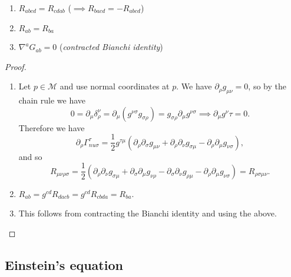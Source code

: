 \documentclass{jknotes}
\begin{document}
\begin{lemma}
    \begin{enumerate}
        \item \(R_{abcd} = R_{cdab}\) (\(\implies R_{bacd} = -R_{abcd}\))
        \item \(R_{ab} = R_{ba}\)
        \item \(\nabla^aG_{ab}=0\) (\emph{contracted Bianchi identity})
    \end{enumerate}
\end{lemma}
\begin{proof}
    \begin{enumerate}
        \item Let \(p\in\mathcal{M}\) and use normal coordinates at \(p\). We have \(\partial_\rho g_{\mu\nu}=0\), so by the chain rule we have
            \begin{equation}
                0 = \partial_\mu\delta_\rho^\nu = \partial_\mu(g^{\nu\sigma}g_{\sigma\rho}) = g_{\sigma\rho}\partial_\mu g^{\nu\sigma} \implies \partial_\mu g^\nu\tau = 0.
            \end{equation}
            Therefore we have
            \begin{equation}
                \partial_\rho \Gamma^\tau_{nu\sigma} = \frac12g^{\tau\mu} (\partial_\rho\partial_\sigma g_{\mu\nu} + \partial_\rho\partial_\nu g_{\sigma\mu} - \partial_\rho\partial_\mu g_{\nu\sigma}),
            \end{equation}
            and so
            \begin{equation}
                R_{\mu\nu\rho\sigma} = \frac12(\partial_\rho\partial_\nu g_{\sigma\mu} + \partial_\sigma\partial_\mu g_{\nu\rho} - \partial_\sigma \partial_\nu g_{\rho\mu} - \partial_\rho\partial_\mu g_{\nu\sigma}) = R_{\rho\sigma\mu\nu}.
            \end{equation}
        \item \(R_{ab} = g^{cd} R_{dacb} = g^{cd} R_{cbda} = R_{ba}\).
        \item This follows from contracting the Bianchi identity and using the above.
    \end{enumerate}
\end{proof}

\subsection{Einstein's equation}
\end{document}

